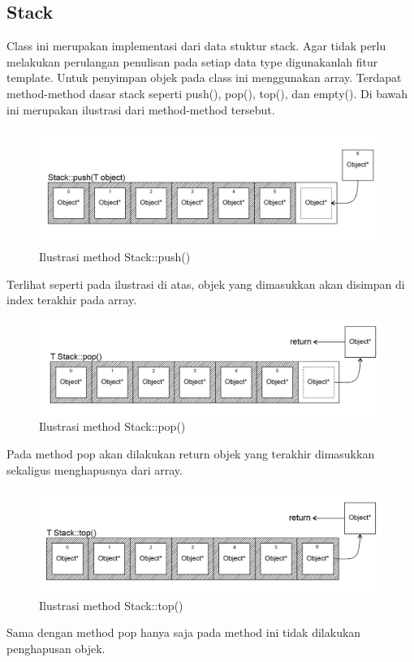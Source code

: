 \documentclass[]{article}
\begin{document}
\subsection{Stack}
Class ini merupakan implementasi dari data stuktur stack. 
Agar tidak perlu melakukan perulangan penulisan pada setiap data type digunakanlah fitur template. 
Untuk penyimpan objek pada class ini menggunakan array. 
Terdapat method-method dasar stack seperti push(), pop(), top(), dan empty(). 
Di bawah ini merupakan ilustrasi dari method-method tersebut.
\begin{figure}[H]
    \centering
    \includegraphics[width=12cm]{stackpush.png}
    \caption{Ilustrasi method Stack::push()}
    \label{fig:stackpush}
\end{figure}
Terlihat seperti pada ilustrasi di atas, objek yang dimasukkan akan disimpan di index terakhir pada array.
\begin{figure}[H]
    \centering
    \includegraphics[width=12cm]{stackpop.png}
    \caption{Ilustrasi method Stack::pop()}
    \label{fig:stackpop}
\end{figure}
Pada method pop akan dilakukan return objek yang terakhir dimasukkan sekaligus menghapusnya dari array.
\begin{figure}[H]
    \centering
    \includegraphics[width=12cm]{stacktop.png}
    \caption{Ilustrasi method Stack::top()}
    \label{fig:stacktop}
\end{figure}
Sama dengan method pop hanya saja pada method ini tidak dilakukan penghapusan objek.
\end{document}
